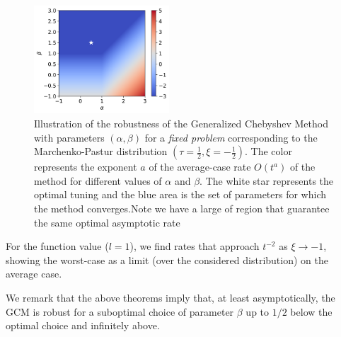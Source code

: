 \documentclass{article}
\begin{document}
\begin{figure}
    \vspace{-.8cm}
    \centering
    \includegraphics[width=0.45\textwidth]{new_imgs/cmap.png}
    \caption{
    \small Illustration of the robustness of the Generalized Chebyshev Method with parameters $(\alpha,\beta)$ for a \emph{fixed problem} corresponding to the Marchenko-Pastur distribution $(\tau=\tfrac12,\xi=-\tfrac12)$. The 
    color represents the exponent $a$ of the average-case rate $O(t^{a})$ of the method for different values of $\alpha$ and $\beta$. The white star represents the optimal tuning and the blue area is the set of parameters for which the method converges.Note we have a large of region  that guarantee the same optimal asymptotic rate}
    \vspace{-1.4cm}
\end{figure}


For the function value ($l=1$), we find rates that approach $t^{-2}$ as $\xi\rightarrow -1$, showing the worst-case as a limit (over the considered distribution) on the average case.

We remark that the above theorems imply that, at least asymptotically, the GCM  is robust for a suboptimal choice of parameter $\beta$ up to $1/2$ below the optimal choice and infinitely above. 
\end{document}
